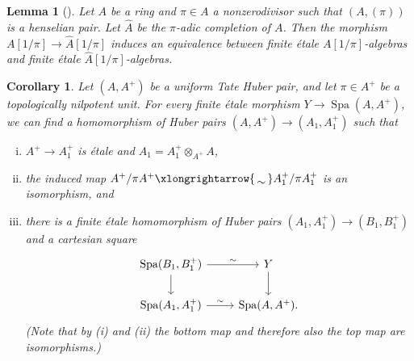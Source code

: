 \documentclass[a4paper,twoside,11pt,reqno]{amsart}
\newcommand{\isomto}{\xlongrightarrow{\,\smash{\raisebox{-0.65ex} 
    {\ensuremath{\displaystyle\sim}}}\,}}
\newcommand{\la}{\longrightarrow}
\DeclareMathOperator{\Spa}{Spa}
\newtheorem{lem}[thm]{Lemma}
\newtheorem{cor}[thm]{Corollary}
\theoremstyle{definition}
\numberwithin{equation}{subsection}
\begin{document}
\begin{lem}[{\cite[Corollaire, p.~578 + Remarque~2(c), p.~588]{Elkik}}] \label{Elkik-theorem} 
    Let $A$ be a ring and $\pi\in A$ a nonzerodivisor such that $(A, (\pi))$ is a henselian pair. Let $\widehat{A}$ be the $\pi$-adic completion of $A$. Then the morphism $A[1/\pi]\to \widehat{A}[1/\pi]$ induces an equivalence between finite \'etale $A[1/\pi]$-algebras and finite \'etale $\widehat{A}[1/\pi]$-algebras.
\end{lem}


\begin{cor} \label{finite-etale-Huber-pair}
    Let $(A,A^+)$ be a uniform Tate Huber pair, and let $\pi \in A^+$ be a topologically nilpotent unit.
    For every finite \'etale morphism $Y \to \Spa(A,A^+)$, we can find a homomorphism of Huber pairs
    $(A,A^+) \la (A_1,A_1^+)$
    such that 
    \begin{enumerate}[(i)]
    \item 
    $A^+ \to A_1^+$ is \'etale and $A_1 = A_1^+ \otimes_{A^+} A$, 
    \item 
    the induced map $A^+/\pi A^+\isomto A_1^+/\pi A_1^+$ is  an isomorphism, and 
    \item 
    there is a finite \'etale homomorphism of Huber pairs $(A_1,A_1^+) \la (B_1,B_1^+)$ and a cartesian square
    \[ 
    \begin{tikzcd}
        \Spa(B_1,B_1^+) \ar[d] \ar[r,"\sim"] & Y \ar[d] \\
        \Spa(A_1,A_1^+) \ar[r,"\sim"] & \Spa(A,A^+) . 
    \end{tikzcd}
    \]
    (Note that by (i) and (ii) the bottom map and therefore also the top map are isomorphisms.)
    \end{enumerate}
\end{cor}
\end{document}
